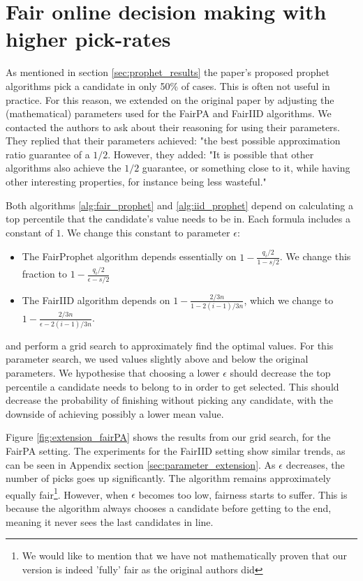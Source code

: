 \section{Fair online decision making with higher pick-rates}
\label{sec:extension}

As mentioned in section \ref{sec:prophet_results} the paper's proposed prophet algorithms pick a candidate in only 50\% of cases. This is often not useful in practice. For this reason, we extended on the original paper by adjusting the (mathematical) parameters used for the FairPA and FairIID algorithms. We contacted the authors to ask about their reasoning for using their parameters. They replied that their parameters achieved: "the best possible approximation ratio guarantee of a $1/2$. However, they added: "It is possible that other algorithms also achieve the $1/2$ guarantee, or something close to it, while having other interesting properties, for instance being less wasteful."

Both algorithms \ref{alg:fair_prophet} and \ref{alg:iid_prophet} depend on calculating a top percentile that the candidate's value needs to be in. Each formula includes a constant of $1$. We change this constant to parameter $\epsilon$:

\begin{itemize}
    \item The FairProphet algorithm depends essentially on $1 - \frac{q_i/2}{1-s/2}$. We change this fraction to $1 - \frac{q_i/2}{\epsilon-s/2}$
    \item The FairIID algorithm depends on $1-\frac{2/3n}{1 - 2(i-1)/3n}$, which we change to $1-\frac{2/3n}{\epsilon - 2(i-1)/3n}$.
\end{itemize}
and perform a grid search to approximately find the optimal values. For this parameter search, we used values slightly above and below the original parameters. We hypothesise that choosing a lower $\epsilon$ should decrease the top percentile a candidate needs to belong to in order to get selected. This should decrease the probability of finishing without picking any candidate, with the downside of achieving possibly a lower mean value.

Figure \ref{fig:extension_fairPA} shows the results from our grid search, for the FairPA setting. The experiments for the FairIID setting show similar trends, as can be seen in Appendix section \ref{sec:parameter_extension}. As $\epsilon$ decreases, the number of picks goes up significantly. The algorithm remains approximately equally fair\footnote{We would like to mention that we have not mathematically proven that our version is indeed 'fully' fair as the original authors did}. However, when $\epsilon$ becomes too low, fairness starts to suffer. This is because the algorithm always chooses a candidate before getting to the end, meaning it never sees the last candidates in line.

